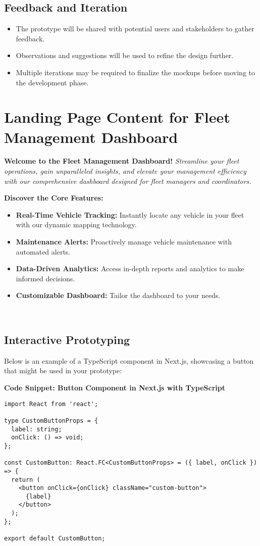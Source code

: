 \subsection*{Feedback and Iteration}
\begin{itemize}
    \item The prototype will be shared with potential users and stakeholders to gather feedback.
    \item Observations and suggestions will be used to refine the design further.
    \item Multiple iterations may be required to finalize the mockups before moving to the development phase.
\end{itemize}

\section*{Landing Page Content for Fleet Management Dashboard}

\textbf{Welcome to the Fleet Management Dashboard!}
\textit{Streamline your fleet operations, gain unparalleled insights, and elevate your management efficiency with our comprehensive dashboard designed for fleet managers and coordinators.}

\textbf{Discover the Core Features:}
\begin{itemize}
    \item \textbf{Real-Time Vehicle Tracking:} Instantly locate any vehicle in your fleet with our dynamic mapping technology.
    \item \textbf{Maintenance Alerts:} Proactively manage vehicle maintenance with automated alerts.
    \item \textbf{Data-Driven Analytics:} Access in-depth reports and analytics to make informed decisions.
    \item \textbf{Customizable Dashboard:} Tailor the dashboard to your needs.
\end{itemize}
\

\subsection*{Interactive Prototyping}
Below is an example of a TypeScript component in Next.js, showcasing a button that might be used in your prototype:

\textbf{Code Snippet: Button Component in Next.js with TypeScript}
\begin{verbatim}
import React from 'react';

type CustomButtonProps = {
  label: string;
  onClick: () => void;
};

const CustomButton: React.FC<CustomButtonProps> = ({ label, onClick }) => {
  return (
    <button onClick={onClick} className="custom-button">
      {label}
    </button>
  );
};

export default CustomButton;
\end{verbatim}

